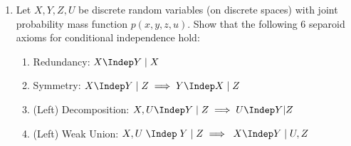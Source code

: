 \begin{enumerate}[label=4.\arabic*]
    Check if $X$ is conditionally independent of $Y$ given $Z$. Provide the steps through your derivations.
    \begin{ungradedsolution}
        Given a rank one matrix $M$ with factorization $M=vw^T$, all other factorizations are related to this factorization by $M=(v \lambda)(w / \lambda)^T$ for $\lambda \in \mathbb{R}\setminus\{0\}$. Choose $\lambda$ such that $\sum v_i=1$. Then if $M$ is normalized, $1=\sum_{ij}M_{ij}=\sum_{ij}v_iw_j=\sum_jw_j$, $w$ is also normalized. Consequently, $v_i=v_i \sum_j w_j = \sum_j M_{ij}$ and $w_j= w_j \sum_i v_i = \sum_i M_{ij} $. If $M$ is non-negative, then $v$ and $w$ are also non-negative. Hence, $v$ and $w$ are the marginals of $M$.

        Hence, for any joint distribution $P(X, Y|Z=z)$, we only need to check if the matrix $p(x, y|z)$ is rank-one, as it can then be written as $p(x,y|z)=p(x|z)p(y|z)$. This is here the case.

        Alternatively, it's easy to read off $p(x|z)$ and $p(y|z)$ from the joint distribution and verify $p(x,y|z)=p(x|z)p(y|z)$, or read off $p(x|z)$ and $p(x|y,z)$ and verify $p(x|z) = p(x|y,z)$.
    \end{ungradedsolution}

    \item %
    Let $X,Y,Z,U$ be discrete random variables (on discrete spaces) with joint probability mass function $p(x,y,z,u)$. Show that the following 6 separoid axioms for conditional independence hold:

    \begin{enumerate}
        \item Redundancy: $X \Indep Y \;|\; X$

        \item Symmetry: $X \Indep Y\; |\; Z \implies Y \Indep X\; |\; Z$

        \item (Left) Decomposition: $X, U \Indep Y \; | \; Z \implies U \Indep Y | Z\; $

        \item (Left) Weak Union: $X,U \;\Indep \;  Y \; | \; Z \implies  \; X \Indep Y \; |\; U,Z $


\end{enumerate}
\end{enumerate}
